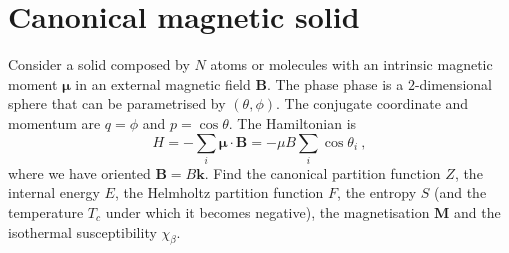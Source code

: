 \section{Canonical magnetic solid}

    \begin{exercise}
        Consider a solid composed by $N$ atoms or molecules with an intrinsic magnetic moment $\boldsymbol \mu$ in an external magnetic field $\mathbf B$. The phase phase is a $2$-dimensional sphere that can be parametrised by $(\theta, \phi)$. The conjugate coordinate and momentum are $q = \phi$ and $p = \cos \theta$. The Hamiltonian is 
        \begin{equation*}
            H = - \sum_i \boldsymbol \mu \cdot \mathbf B = - \mu B \sum_i \cos \theta_i ~,
        \end{equation*}
        where we have oriented $\mathbf B = B \mathbf k$. Find the canonical partition function $Z$, the internal energy $E$, the Helmholtz partition function $F$, the entropy $S$ (and the temperature $T_c$ under which it becomes negative), the magnetisation $\mathbf M$ and the isothermal susceptibility $\chi_\beta$. 
    \end{exercise}

